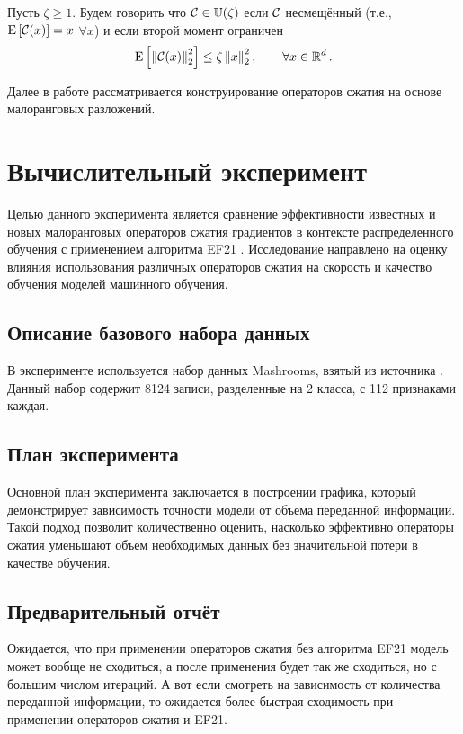 \documentclass{article}
\begin{document}
\begin{definition}
Пусть $\zeta \geq 1$. Будем говорить что ${\cal C}\in \mathbb{U}(\zeta)$ если ${\cal C}$ несмещённый (т.е., ${{\rm E}}\left[{\cal C}(x)\right]=x$  $\forall x$) и если второй момент ограничен 
\begin{equation}
 {{\rm E}}\left[ \left\| {\cal C}(x) \right\|_2^2 \right] \leq \zeta  \left\| x \right\|_2^2, \qquad \forall x\in\mathbb{R}^d \,.
\end{equation} 

\end{definition}

Далее в работе рассматривается конструирование операторов сжатия на основе малоранговых разложений. 

\section{Вычислительный эксперимент}

Целью данного эксперимента является сравнение эффективности известных и новых малоранговых операторов сжатия градиентов в контексте распределенного обучения с применением алгоритма EF21 \citep{richtarik2021ef21}. Исследование направлено на оценку влияния использования различных операторов сжатия на скорость и качество обучения моделей машинного обучения.

\subsection{Описание базового набора данных}
В эксперименте используется набор данных Mashrooms, взятый из источника \citep{chang2011libsvm}. Данный набор содержит 8124 записи, разделенные на 2 класса, с 112 признаками каждая. 

\subsection{План эксперимента}
Основной план эксперимента заключается в построении графика, который демонстрирует зависимость точности модели от объема переданной информации. Такой подход позволит количественно оценить, насколько эффективно операторы сжатия уменьшают объем необходимых данных без значительной потери в качестве обучения.

\subsection{Предварительный отчёт}
Ожидается, что при применении операторов сжатия без алгоритма EF21 модель может вообще не сходиться, а после применения будет так же сходиться, но с большим числом итераций. А вот если смотреть на зависимость от количества переданной информации, то ожидается более быстрая сходимость при применении операторов сжатия и EF21.
\end{document}

